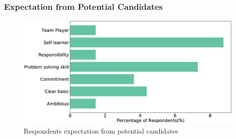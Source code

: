 \subsubsection{Expectation from Potential Candidates}
\label{Expectation from Potential Candidates}
\begin{figure}[htbp]
\includegraphics[scale=0.28]{Figures/CandidatesExpectation.eps} 
\caption{Respondents expectation from potential candidates}
\label{fig:candidate expectation}
\end{figure}

